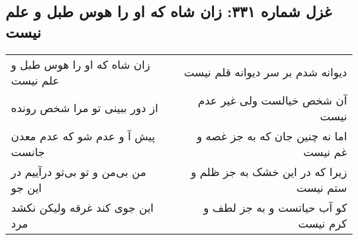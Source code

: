 \begin{center}
\section*{غزل شماره ۳۳۱: زان شاه که او را هوس طبل و علم نیست}
\label{sec:0331}
\begin{longtable}{l p{0.5cm} r}
زان شاه که او را هوس طبل و علم نیست
&&
دیوانه شدم بر سر دیوانه قلم نیست
\\
از دور ببینی تو مرا شخص رونده
&&
آن شخص خیالست ولی غیر عدم نیست
\\
پیش آ و عدم شو که عدم معدن جانست
&&
اما نه چنین جان که به جز غصه و غم نیست
\\
من بی‌من و تو بی‌تو درآییم در این جو
&&
زیرا که در این خشک به جز ظلم و ستم نیست
\\
این جوی کند غرقه ولیکن نکشد مرد
&&
کو آب حیاتست و به جز لطف و کرم نیست
\\
\end{longtable}
\end{center}
